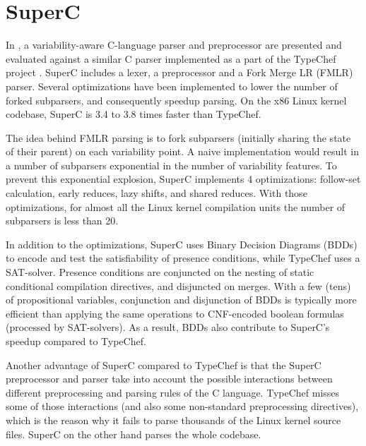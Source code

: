 \documentclass[11pt]{article}
\begin{document}
\section{SuperC}
In \cite{Gazzillo:2012}, a variability-aware C-language parser and preprocessor are presented and evaluated against a similar C parser implemented as a part of the TypeChef project \cite{Kastner:2011}. SuperC includes a lexer, a preprocessor and a Fork Merge LR (FMLR) parser. Several optimizations have been implemented to lower the number of forked subparsers, and consequently speedup parsing. On the x86 Linux kernel codebase, SuperC is 3.4 to 3.8 times faster than TypeChef.

The idea behind FMLR parsing is to fork subparsers (initially sharing the state of their parent) on each variability point. A naive implementation would result in a number of subparsers exponential in the number of variability features. To prevent this exponential explosion, SuperC implements 4 optimizations: follow-set calculation, early reduces, lazy shifts, and shared reduces. With those optimizations, for almost all the Linux kernel compilation units the number of subparsers is less than 20.

In addition to the optimizations, SuperC uses Binary Decision Diagrams (BDDs) to encode and test the satisfiability of presence conditions, while TypeChef uses a SAT-solver. Presence conditions are conjuncted on the nesting of static conditional compilation directives, and disjuncted on merges. With a few (tens) of propositional variables, conjunction and disjunction of BDDs is typically more efficient than applying the same operations to CNF-encoded boolean formulas (processed by SAT-solvers). As a result, BDDs also contribute to SuperC's speedup compared to TypeChef.

Another advantage of SuperC compared to TypeChef is that the SuperC preprocessor and parser take into account the possible interactions between different preprocessing and parsing rules of the C language. TypeChef misses some of those interactions (and also some non-standard preprocessing directives), which is the reason why it fails to parse thousands of the Linux kernel source files. SuperC on the other hand parses the whole codebase.


 
\end{document}
